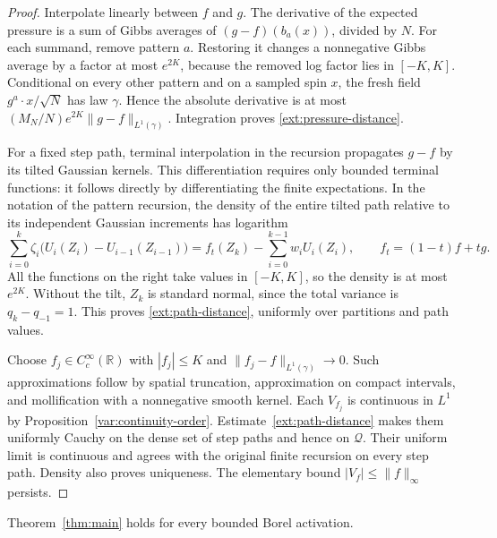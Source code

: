 \begin{proof}
Interpolate linearly between $f$ and $g$. The derivative of the expected
pressure is a sum of Gibbs averages of $(g-f)(b_a(x))$, divided by $N$.
For each summand, remove pattern $a$. Restoring it changes a nonnegative
Gibbs average by a factor at most $e^{2K}$, because the removed log factor
lies in $[-K,K]$. Conditional on every other pattern and on a sampled spin
$x$, the fresh field $g^a\cdot x/\sqrt N$ has law $\gamma$. Hence the
absolute derivative is at most
$(M_N/N)e^{2K}\|g-f\|_{L^1(\gamma)}$. Integration proves
\eqref{ext:pressure-distance}.

For a fixed step path, terminal interpolation in the recursion propagates
$g-f$ by its tilted Gaussian kernels. This differentiation requires only
bounded terminal functions: it follows directly by differentiating the
finite expectations. In the notation of the pattern recursion, the density
of the entire tilted path relative to its independent Gaussian increments
has logarithm
\begin{equation}\label{ext:telescoped-density}
 \sum_{i=0}^{k}\zeta_i\big(U_i(Z_i)-U_{i-1}(Z_{i-1})\big)
 =f_t(Z_k)-\sum_{i=0}^{k-1}w_iU_i(Z_i),
 \qquad f_t=(1-t)f+tg.
\end{equation}
All the functions on the right take values in $[-K,K]$, so the density is
at most $e^{2K}$. Without the tilt, $Z_k$ is standard normal, since the
total variance is $q_k-q_{-1}=1$. This proves
\eqref{ext:path-distance}, uniformly over partitions and path values.

Choose $f_j\in C_c^\infty(\mathbb R)$ with $|f_j|\le K$ and
$\|f_j-f\|_{L^1(\gamma)}\to0$. Such approximations follow by spatial
truncation, approximation on compact intervals, and mollification with a
nonnegative smooth kernel. Each $V_{f_j}$ is continuous in $L^1$ by
Proposition~\ref{var:continuity-order}. Estimate~\eqref{ext:path-distance}
makes them uniformly Cauchy on the dense set of step paths and hence on
$\mathcal Q$. Their uniform limit is continuous and agrees with the
original finite recursion on every step path. Density also proves
uniqueness. The elementary bound $|V_f|\le\|f\|_\infty$ persists.
\end{proof}

\begin{proposition}\label{ext:bounded}
Theorem~\ref{thm:main} holds for every bounded Borel activation.
\end{proposition}

